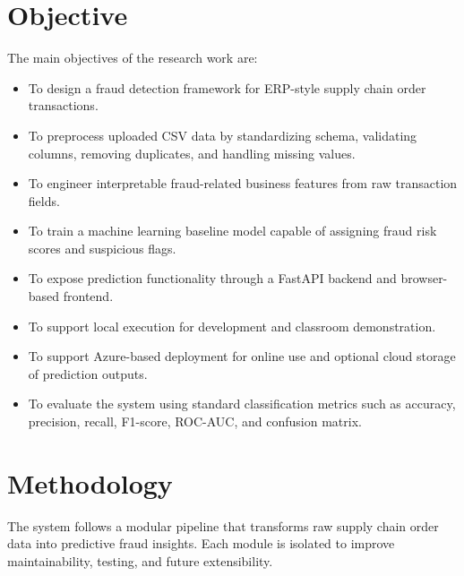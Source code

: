 \documentclass[a4paper,12pt]{article}
\begin{document}
\section{Objective}
The main objectives of the research work are:
\begin{itemize}[noitemsep]
    \item To design a fraud detection framework for ERP-style supply chain order transactions.
    \item To preprocess uploaded CSV data by standardizing schema, validating columns, removing duplicates, and handling missing values.
    \item To engineer interpretable fraud-related business features from raw transaction fields.
    \item To train a machine learning baseline model capable of assigning fraud risk scores and suspicious flags.
    \item To expose prediction functionality through a FastAPI backend and browser-based frontend.
    \item To support local execution for development and classroom demonstration.
    \item To support Azure-based deployment for online use and optional cloud storage of prediction outputs.
    \item To evaluate the system using standard classification metrics such as accuracy, precision, recall, F1-score, ROC-AUC, and confusion matrix.
\end{itemize}

\section{Methodology}
The system follows a modular pipeline that transforms raw supply chain order data into predictive fraud insights. Each module is isolated to improve maintainability, testing, and future extensibility.
\end{document}
